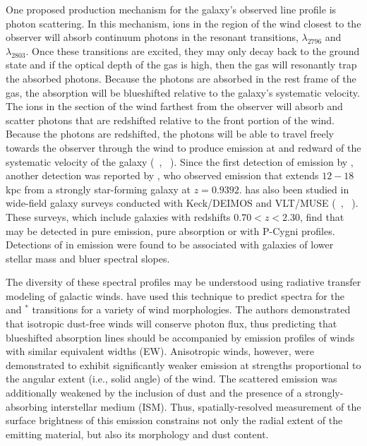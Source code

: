 \documentclass[twocolumn]{aastex61}
\newcommand{\citethnop}[1]{\citeauthor{#1}\ \citeyear{#1}}
\begin{document}
One proposed production mechanism for the galaxy's observed  line profile is photon scattering. In this mechanism,  ions in the region of the wind closest to the observer will absorb continuum photons in the resonant transitions, $\lambda_{2796}$ and $\lambda_{2803}$. Once these transitions are excited, they may only decay back to the ground state and if the optical depth of the gas is high, then the gas will resonantly trap the absorbed photons. Because the photons are absorbed in the rest frame of the gas, the absorption will be blueshifted relative to the galaxy's systematic velocity. The  ions in the section of the wind farthest from the observer will absorb and scatter photons that are redshifted relative to the front portion of the wind. Because the photons are redshifted, the photons will be able to travel freely towards the observer through the wind to produce emission at and redward of the systematic velocity of the galaxy (\citethnop{Rubin_2011}, \citethnop{Prochaska_2011}). Since the first detection of  emission by \citet{Rubin_2011}, another detection was reported by \cite{Martin2013}, who observed  emission that extends $12-18$ kpc from a strongly star-forming galaxy
at $z=0.9392$.    has also been studied in wide-field galaxy surveys conducted with Keck/DEIMOS and VLT/MUSE  (\citethnop{Erb2012}, \citethnop{Feltre2018}). These surveys, which include galaxies with redshifts $ 0.70 < z < 2.30$, find that  may be detected in pure emission, pure absorption or with P-Cygni profiles.  Detections of  in emission were found to be associated with galaxies of lower stellar mass and bluer spectral slopes.

The diversity of these spectral profiles may be understood using radiative transfer modeling of galactic winds.
\citet{Prochaska_2011} have used this technique to predict 
spectra for the   and  $^*$ transitions for a variety of wind morphologies.
The authors demonstrated that isotropic dust-free winds will conserve photon flux, thus predicting that blueshifted absorption lines should be accompanied by emission profiles of winds with similar equivalent widths (EW). Anisotropic winds, however, were demonstrated to exhibit significantly weaker emission at strengths proportional to the angular extent (i.e., solid angle) of the wind. The scattered emission was additionally weakened by the inclusion of dust and the presence of a strongly-absorbing interstellar medium (ISM).
Thus, spatially-resolved measurement of the surface brightness of this emission constrains not only the radial extent of the emitting material, but also its morphology and dust content.
\end{document}
